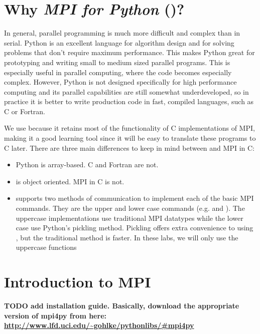 

  \section*{Why \emph{MPI for Python} ()?}
    In general, parallel programming is much more difficult and complex than in serial. Python is an excellent language for algorithm design and for solving problems that don't require maximum performance. This makes Python great for prototyping and writing small to medium sized parallel programs. This is especially useful in parallel computing, where the code becomes especially complex. However, Python is not designed specifically for high performance computing and its parallel capabilities are still somewhat underdeveloped, so in practice it is better to write production code in fast, compiled languages, such as C or Fortran.

    We use  because it retains most of the functionality of C implementations of MPI, making it a good learning tool since it will be easy to translate these programs to C later. There are three main differences to keep in mind between  and MPI in C:
    \begin{itemize}
      \item Python is array-based. C and Fortran are not.
      \item {} is object oriented. MPI in C is not.
      \item {} supports two methods of communication to implement each of the basic MPI commands. They are the upper and lower case commands (e.g.  and ). The uppercase implementations use traditional MPI datatypes while the lower case use Python's pickling method. Pickling offers extra convenience to using , but the traditional method is faster. In these labs, we will only use the uppercase functions
    \end{itemize}


  \section*{Introduction to MPI}
    \textbf{TODO add installation guide. Basically, download the appropriate version of mpi4py from here: \url{http://www.lfd.uci.edu/~gohlke/pythonlibs/\#mpi4py}}

